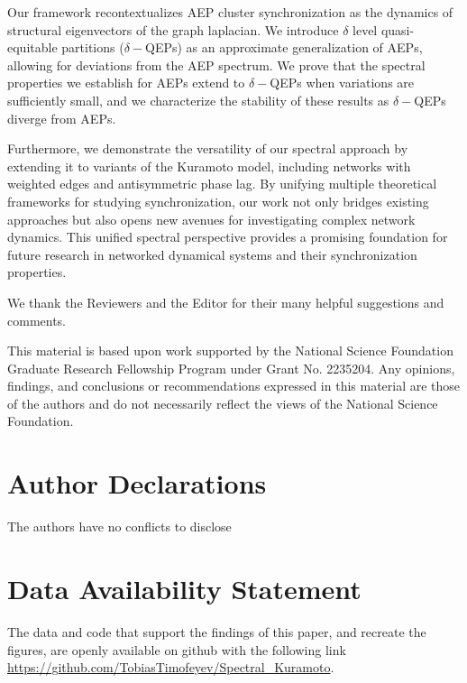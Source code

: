 \documentclass[%
 aip,
 amsmath,amssymb,
preprint,
reprint, onecolumn %
]{revtex4-1}
\begin{document}
Our framework recontextualizes AEP cluster synchronization as the dynamics of structural eigenvectors of the graph laplacian. We introduce $\delta$ level quasi-equitable partitions ($\delta-$QEPs) as an approximate generalization of AEPs, allowing for deviations from the AEP spectrum. We prove that the spectral properties we establish for AEPs extend to $\delta-$QEPs when variations are sufficiently small, and we characterize the stability of these results as $\delta-$QEPs diverge from AEPs.

Furthermore, we demonstrate the versatility of our spectral approach by extending it to variants of the Kuramoto model, including networks with weighted edges and antisymmetric phase lag. By unifying multiple theoretical frameworks for studying synchronization, our work not only bridges existing approaches but also opens new avenues for investigating complex network dynamics. This unified spectral perspective provides a promising foundation for future research in networked dynamical systems and their synchronization properties.

\begin{acknowledgments}
We thank the Reviewers and the Editor for their many helpful suggestions and comments.

This material is based upon work supported by the National Science Foundation Graduate 
Research Fellowship Program under Grant No. 2235204. Any opinions, findings, 
and conclusions or recommendations expressed in this material are those of the authors 
and do not necessarily reflect the views of the National Science Foundation.
\end{acknowledgments}



\section*{Author Declarations}
The authors have no conflicts to disclose



\section*{Data Availability Statement}
The data and code that support the findings of this paper, and recreate the figures, are openly
available on github with the following link \url{https://github.com/TobiasTimofeyev/Spectral_Kuramoto}\cite{timofeyev2025spectral}.


\appendix
\end{document}
